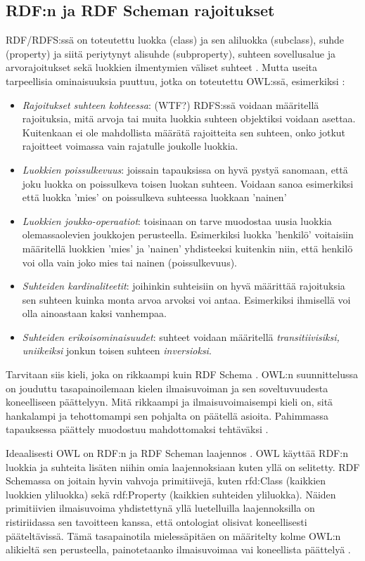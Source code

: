 \documentclass[a4paper,10pt]{article}
\begin{document}
\subsection{RDF:n ja RDF Scheman rajoitukset}
RDF/RDFS:ssä on toteutettu luokka (class) ja sen aliluokka (subclass), suhde (property) ja siitä periytynyt alisuhde (subproperty), suhteen sovellusalue ja arvorajoitukset sekä luokkien ilmentymien väliset suhteet \cite{AH09}. Mutta useita tarpeellisia ominaisuuksia puuttuu, jotka on toteutettu OWL:ssä, esimerkiksi \cite{AH09}:
\begin{itemize}
 \item \textit{Rajoitukset suhteen kohteessa}: (WTF?) RDFS:ssä voidaan määritellä rajoituksia, mitä arvoja tai muita luokkia suhteen objektiksi voidaan asettaa. Kuitenkaan ei ole mahdollista määrätä rajoitteita sen suhteen, onko jotkut rajoitteet voimassa vain rajatulle joukolle luokkia. 
 \item \textit{Luokkien poissulkevuus}: joissain tapauksissa on hyvä pystyä sanomaan, että joku luokka on poissulkeva toisen luokan suhteen. Voidaan sanoa esimerkiksi että luokka 'mies' on poissulkeva suhteessa luokkaan 'nainen'
 \item \textit{Luokkien joukko-operaatiot}: toisinaan on tarve muodostaa uusia luokkia olemassaolevien joukkojen perusteella. Esimerkiksi luokka 'henkilö' voitaisiin määritellä luokkien 'mies' ja 'nainen' yhdisteeksi kuitenkin niin, että henkilö voi olla vain joko mies tai nainen (poissulkevuus).
 \item \textit{Suhteiden kardinaliteetit}: joihinkin suhteisiin on hyvä määrittää rajoituksia sen suhteen kuinka monta arvoa arvoksi voi antaa. Esimerkiksi ihmisellä voi olla ainoastaan kaksi vanhempaa.
 \item \textit{Suhteiden erikoisominaisuudet}: suhteet voidaan määritellä \textit{transitiivisiksi, uniikeiksi} jonkun toisen suhteen \textit{inversioksi}. 
\end{itemize}
Tarvitaan siis kieli, joka on rikkaampi kuin RDF Schema \cite{AH09}. OWL:n suunnittelussa on jouduttu tasapainoilemaan kielen ilmaisuvoiman ja sen soveltuvuudesta koneelliseen päättelyyn. Mitä rikkaampi ja ilmaisuvoimaisempi kieli on, sitä hankalampi ja tehottomampi sen pohjalta on päätellä asioita. Pahimmassa tapauksessa päättely muodostuu mahdottomaksi tehtäväksi \cite{AH09}.   

Ideaalisesti OWL on RDF:n ja RDF Scheman laajennos \cite{AH09}. OWL käyttää RDF:n luokkia ja suhteita lisäten niihin omia laajennoksiaan kuten yllä on selitetty. RDF Schemassa on joitain hyvin vahvoja primitiivejä, kuten rfd:Class (kaikkien luokkien yliluokka) sekä rdf:Property (kaikkien suhteiden yliluokka). Näiden primitiivien ilmaisuvoima yhdistettynä yllä luetelluilla laajennoksilla on ristiriidassa sen tavoitteen kanssa, että ontologiat olisivat koneellisesti pääteltävissä. Tämä tasapainotila mielessäpitäen on määritelty kolme OWL:n alikieltä sen perusteella, painotetaanko ilmaisuvoimaa vai koneellista päättelyä \cite{AH09}.  
\end{document}
